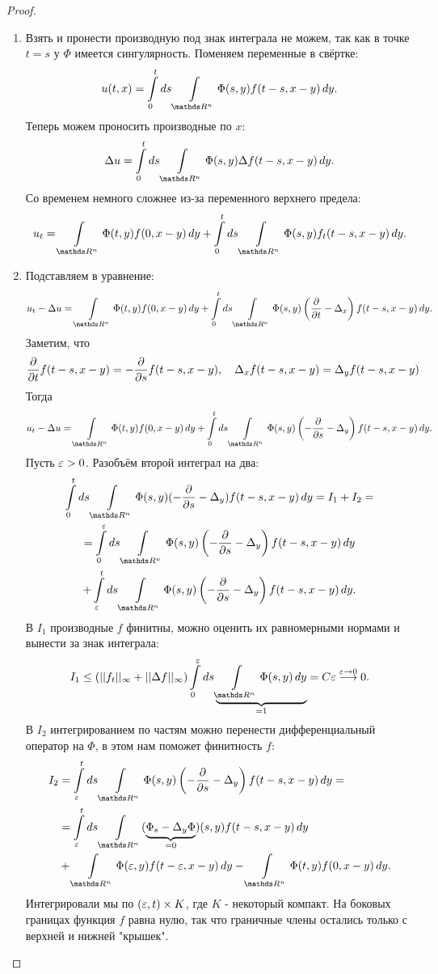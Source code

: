 \begin{proof}

\begin{enumerate}
\item Взять и пронести производную под знак интеграла не можем, так как в точке $t = s$ у $\Phi$ имеется сингулярность. Поменяем переменные в свёртке:
$$ u(t, x) = \int \limits_0^t ds \int \limits_{\real^n} \Phi(s,y) f(t-s, x-y) \,dy.$$
Теперь можем проносить производные по $x$:
$$ \Delta u = \int \limits_0^t ds \int \limits_{\real^n} \Phi(s,y) \Delta f (t-s, x-y) \, dy.$$
Со временем немного сложнее из-за переменного верхнего предела:
$$  u_t = \int \limits_{\real^n} \Phi(t,y) f(0, x-y) \, dy + \int \limits_0^t ds \int \limits_{\real^n} \Phi(s,y) f_t(t-s,x-y) \, dy.$$
\item Подставляем в уравнение:
$$ u_t - \Delta u = \int \limits_{\real^n} \Phi(t,y) f(0, x-y) \, dy +  \int \limits_0^t ds \int \limits_{\real^n} \Phi(s,y) \left( \pder{t} - \Delta_x \right) f(t-s, x-y) \, dy.$$
Заметим, что
$$ \frac{\partial}{\partial t} f(t-s,x-y) = - \frac{\partial}{\partial s} f(t-s, x-y), \quad \Delta_x f(t-s, x-y) = \Delta_y f(t-s, x-y)$$
Тогда
$$ u_t - \Delta u = \int \limits_{\real^n} \Phi(t,y) f(0, x-y) \, dy +  \int \limits_0^t ds \int \limits_{\real^n} \Phi(s,y) \left( -\pder{s} - \Delta_y \right) f(t-s, x-y) \, dy.$$
Пусть $\varepsilon > 0$. Разобъём второй интеграл на два:
\begin{gather*}
\int \limits_0^t ds \int \limits_{\real^n} \Phi(s,y) (-\pder{s} - \Delta_y) f(t-s, x-y) \, dy = I_1 + I_2 = \\ 
= \int \limits_0^\eps ds \int \limits_{\real^n} \Phi(s,y) \left(-\pder{s} - \Delta_y \right) f(t-s, x-y) \, dy \\
+ \int \limits_\eps^t ds \int \limits_{\real^n} \Phi(s,y) \left( -\pder{s} - \Delta_y \right) f(t-s, x-y) \, dy.
\end{gather*}
В $I_1$ производные $f$ финитны, можно оценить их равномерными нормами и вынести за знак интеграла:
$$I_1 \leq (|| f_t ||_\infty + || \Delta f ||_\infty) \int \limits_0^\eps ds \underbrace {\int \limits_{\real^n} \Phi(s,y) \, dy }_{=1} = C \eps \stackrel {\eps \to 0} {\longrightarrow} 0. $$
В $I_2$ интегрированием по частям можно перенести дифференциальный оператор на $\Phi$, в этом нам поможет финитность $f$:
\begin{align*}
	I_2 &= \int \limits_\eps^t ds \int \limits_{\real^n} \Phi(s,y) \left( - \pder{s} - \Delta_y \right) f(t-s, x-y) \, dy = \\
	&= \int \limits_\eps^t ds \int \limits_{\real^n} (\underbrace {\Phi_s - \Delta_y\Phi}_{=0})(s,y) f(t-s, x-y) \, dy \\
	& +  \int \limits_{\real^n} \Phi(\eps, y) f(t - \eps, x-y) \, dy - \int \limits_{\real^n} \Phi(t, y) f(0, x-y) \, dy.
\end{align*} 
Интегрировали мы по $(\varepsilon, t) \times K$, где $K$ - некоторый компакт. На боковых границах функция $f$ равна нулю, так что граничные члены остались только с верхней и нижней "крышек".


\end{enumerate}
\end{proof}
